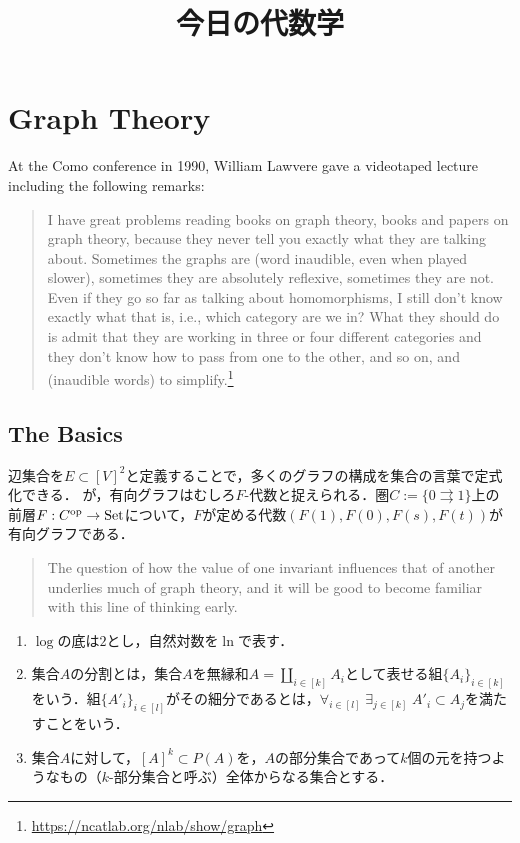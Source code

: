 \documentclass[uplatex,dvipdfmx]{jsreport}
\title{今日の代数学}
\author{}
\begin{document}
\chapter{Graph Theory}

At the Como conference in 1990, William Lawvere gave a videotaped lecture including the following remarks:
\begin{quotation}
    I have great problems reading books on graph theory, books and papers on graph theory, because they never tell you exactly what they are talking about. Sometimes the graphs are (word inaudible, even when played slower), sometimes they are absolutely reflexive, sometimes they are not. Even if they go so far as talking about homomorphisms, I still don’t know exactly what that is, i.e., which category are we in? What they should do is admit that they are working in three or four different categories and they don’t know how to pass from one to the other, and so on, and (inaudible words) to simplify.\footnote{\url{https://ncatlab.org/nlab/show/graph}}
\end{quotation}

\section{The Basics}

\begin{tcolorbox}[colframe=ForestGreen, colback=ForestGreen!10!white, breakable ,colbacktitle=ForestGreen!40!white, coltitle=black,fonttitle=\bfseries\sffamily,
    title=グラフの定義]
    辺集合を$E\subset[V]^2$と定義することで，多くのグラフの構成を集合の言葉で定式化できる．
    が，有向グラフはむしろ$F$-代数と捉えられる．圏$C:=\{0\rightrightarrows 1\}$上の前層$F:C^{\mathrm{op}}\to\mathrm{Set}$について，$F$が定める代数$(F(1),F(0),F(s),F(t))$が有向グラフである．
    \begin{quote}
        The question of how the value of one invariant influences that of another underlies much of graph theory, and it will be good to become familiar with this line of thinking early.
    \end{quote}
\end{tcolorbox}

\begin{notation}\mbox{}
    \begin{enumerate}
        \item $\log$の底は$2$とし，自然対数を$\ln$で表す．
        \item 集合$A$の分割とは，集合$A$を無縁和$A=\coprod_{i\in[k]}A_i$として表せる組$\{A_i\}_{i\in[k]}$をいう．組$\{A'_i\}_{i\in[l]}$がその細分であるとは，$\forall_{i\in[l]}\;\exists_{j\in[k]}\;A'_i\subset A_j$を満たすことをいう．
        \item 集合$A$に対して，$[A]^k\subset P(A)$を，$A$の部分集合であって$k$個の元を持つようなもの（$k$-部分集合と呼ぶ）全体からなる集合とする．
    \end{enumerate}
\end{notation}
\end{document}
